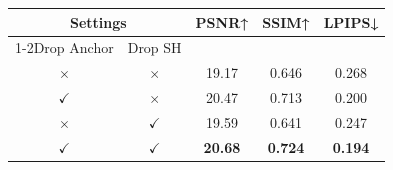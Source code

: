 \begin{tabular}{cc|ccc}
\toprule
\multicolumn{2}{c|}{Settings} & \multirow{2}[4]{*}{PSNR↑} & \multirow{2}[4]{*}{SSIM↑} & \multirow{2}[4]{*}{LPIPS↓} \\
\cmidrule{1-2}Drop Anchor & Drop SH &       &       &  \\
\midrule
$\times$ & $\times$ & 19.17 & 0.646 & 0.268 \\
$\checkmark$ & $\times$ & 20.47 & 0.713 & 0.200  \\
$\times$ & $\checkmark$ & 19.59 & 0.641 & 0.247 \\
$\checkmark$ & $\checkmark$ & \textbf{20.68} & \textbf{0.724} & \textbf{0.194} \\
\bottomrule
\end{tabular}%
